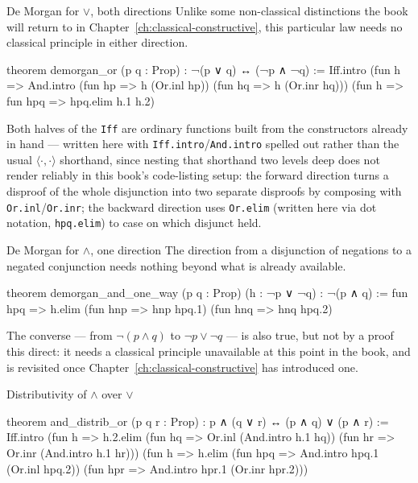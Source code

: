 \begin{experiment}{De Morgan for $\lor$, both directions}
Unlike some non-classical distinctions the book will return to in
Chapter~\ref{ch:classical-constructive}, this particular law needs
no classical principle in either direction.
\begin{lean}
theorem demorgan_or (p q : Prop) : ¬(p ∨ q) ↔ (¬p ∧ ¬q) :=
  Iff.intro
    (fun h => And.intro
      (fun hp => h (Or.inl hp)) (fun hq => h (Or.inr hq)))
    (fun h => fun hpq => hpq.elim h.1 h.2)
\end{lean}
Both halves of the \texttt{Iff} are ordinary functions built from
the constructors already in hand — written here with
\texttt{Iff.intro}/\texttt{And.intro} spelled out rather than the
usual $\langle \cdot, \cdot \rangle$ shorthand, since nesting that
shorthand two levels deep does not render reliably in this book's
code-listing setup: the forward direction turns a disproof of the
whole disjunction into two separate disproofs by composing with
\texttt{Or.inl}/\texttt{Or.inr}; the backward direction uses
\texttt{Or.elim} (written here via dot notation, \texttt{hpq.elim})
to case on which disjunct held.
\end{experiment}

\begin{experiment}{De Morgan for $\land$, one direction}
The direction from a disjunction of negations to a negated
conjunction needs nothing beyond what is already available.
\begin{lean}
theorem demorgan_and_one_way (p q : Prop) (h : ¬p ∨ ¬q) :
    ¬(p ∧ q) :=
  fun hpq => h.elim (fun hnp => hnp hpq.1) (fun hnq => hnq hpq.2)
\end{lean}
The converse — from $\lnot(p \land q)$ to $\lnot p \lor \lnot q$ —
is also true, but not by a proof this direct: it needs a classical
principle unavailable at this point in the book, and is revisited
once Chapter~\ref{ch:classical-constructive} has introduced one.
\end{experiment}

\begin{experiment}{Distributivity of $\land$ over $\lor$}
\begin{lean}
theorem and_distrib_or (p q r : Prop) :
    p ∧ (q ∨ r) ↔ (p ∧ q) ∨ (p ∧ r) :=
  Iff.intro
    (fun h => h.2.elim
      (fun hq => Or.inl (And.intro h.1 hq))
      (fun hr => Or.inr (And.intro h.1 hr)))
    (fun h => h.elim
      (fun hpq => And.intro hpq.1 (Or.inl hpq.2))
      (fun hpr => And.intro hpr.1 (Or.inr hpr.2)))
\end{lean}
\end{experiment}

